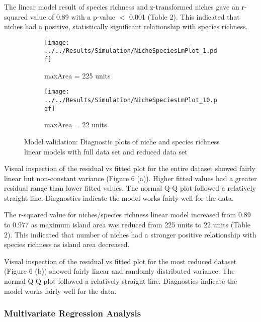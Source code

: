 \documentclass{article}
\begin{document}
The linear model result of species richness and z-transformed niches gave an r-squared value of 0.89 with a p-value $<$ 0.001 (Table 2). This indicated that niches had a positive, statistically significant relationship with species richness. \bigskip

\begin{figure}[h!]
  \centering
  \begin{subfigure}[b]{0.4\linewidth}
    \texttt{[image: ../../Results/Simulation/NicheSpeciesLmPlot\_1.pdf]}
    \caption{maxArea = 225 units}
  \end{subfigure}
  \begin{subfigure}[b]{0.4\linewidth}
    \texttt{[image: ../../Results/Simulation/NicheSpeciesLmPlot\_10.pdf]}
    \caption{maxArea = 22 units}
  \end{subfigure}
  \caption{Model validation: Diagnostic plots of niche and species richness linear models with full data set and reduced data set}
  \label{fig:Model validation niche/species LM}
\end{figure}

Visual inspection of the residual vs fitted plot for the entire dataset showed fairly linear but non-constant variance (Figure 6 (a)). Higher fitted values had a greater residual range than lower fitted values. The normal Q-Q plot followed a relatively straight line. Diagnostics indicate the model works fairly well for the data. \bigskip

The r-squared value for niches/species richness linear model increased from 0.89 to 0.977 as maximum island area was reduced from 225 units to 22 units (Table 2). This indicated that number of niches had a stronger positive relationship with species richness as island area decreased. \bigskip

Visual inspection of the residual vs fitted plot for the most reduced dataset (Figure 6 (b)) showed fairly linear and randomly distributed variance. The normal Q-Q plot followed a relatively straight line.  Diagnostics indicate the model works fairly well for the data. \bigskip

\subsubsection{Multivariate Regression Analysis}
\end{document}
